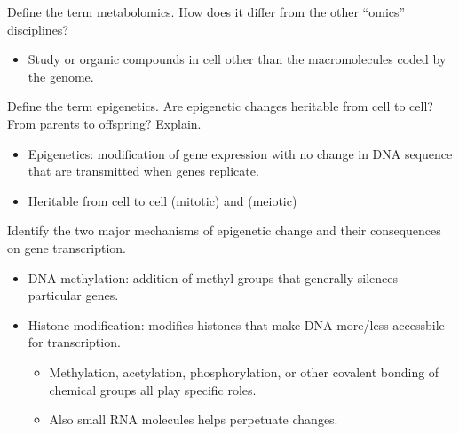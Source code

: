 \documentclass[12pt,a4paper]{article}
\begin{document}
\begin{itemize}
\begin{itemize}
        \end{itemize}
    {\color{G-Moon}\item Define the term metabolomics. How does it differ from the other “omics” disciplines?}
        \begin{itemize}
            \item Study or organic compounds in cell other than the macromolecules coded by the genome. 
        \end{itemize}
    {\color{G-Moon}\item Define the term epigenetics. Are epigenetic changes heritable from cell to cell? From parents to offspring? Explain.}
        \begin{itemize}
            \item Epigenetics: modification of gene expression with no change in DNA sequence that are transmitted when genes replicate.
            \item Heritable from cell to cell (mitotic) and (meiotic) 
        \end{itemize}
    {\color{G-Moon}\item Identify the two major mechanisms of epigenetic change and their consequences on gene transcription.}
        \begin{itemize}
            \item DNA methylation: addition of methyl groups that generally silences particular genes.
            \item Histone modification: modifies histones that make DNA more/less accessbile for transcription. 
                \begin{itemize}
                    \item Methylation, acetylation, phosphorylation, or other covalent bonding of chemical groups all play specific roles.
                    \item Also small RNA molecules helps perpetuate changes.
                \end{itemize}
        \end{itemize}
\end{itemize}

\clearpage
{}
\end{document}

